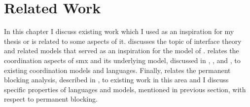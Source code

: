 %
\chapter{Related Work}
\label{chap_related}

In this chapter I discuss existing work which I used as an inspiration for my thesis or is related to some aspects of it.
\Sect{\ref{sect_related_interface}} discusses the topic of interface theory and related models that served as an inspiration for the model of \Chap{\ref{chap_ecm}}.
\Sect{\ref{sect_related_coord}} relates the coordination aspects of \gls*{smx} and its underlying model, discussed in \Chap{\ref{chap_ecm}}, \Chap{\ref{chap_tcm}}, and \Chap{\ref{chap_smx}}, to existing coordination models and languages.
Finally, \Sect{\ref{sect_related_dl}} relates the permanent blocking analysis, described in \Sect{\ref{chap_block}}, to existing work in this area and I discuss specific properties of languages and models, mentioned in previous section, with respect to permanent blocking.


